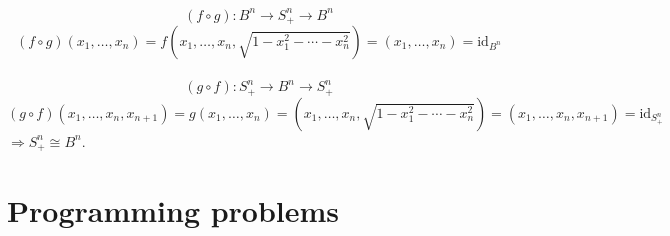 \documentclass[a4paper,11pt]{article}
\begin{document}
$$ (f \circ g): B^n \to S_{+}^{n} \to B^n $$
$$ (f \circ g)(x_1, \ldots, x_n) = f \left(x_1, \ldots, x_n, \sqrt{ 1 - x_1^2 - \cdots - x_n^2} \right) = (x_1, \ldots, x_n) = \text{id}_{B^n}$$
\\
$$ (g \circ f): S_{+}^{n} \to B^n \to S_{+}^{n} $$
$$ (g \circ f)(x_1, \ldots, x_n, x_{n + 1}) = g(x_1, \ldots, x_n) = \left(x_1, \ldots, x_n, \sqrt{ 1 - x_1^2 - \cdots - x_n^2} \right) = (x_1, \ldots, x_n, x_{n + 1}) = \text{id}_{S_{+}^{n}}$$
\noindent
$ \Longrightarrow S_{+}^{n} \cong B^n.$

\section{Programming problems}
\end{document}
